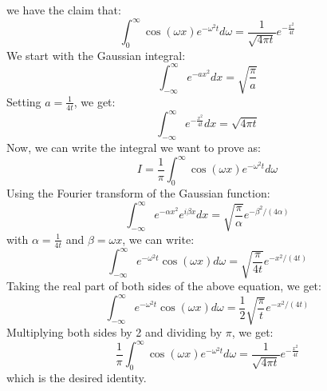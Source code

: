 \documentclass[12pt]{article} %
\begin{document}
we have the claim that:
$$
\int_{0}^{\infty} \cos(\omega x) e^{- \omega^{2} t}  d \omega = \frac{1}{\sqrt{4 \pi t}} e^{-\frac{x^2}{4t}}
$$
We start with the Gaussian integral:
$$\int_{-\infty}^{\infty} e^{-ax^2} dx = \sqrt{\frac{\pi}{a}}$$
Setting $a = \frac{1}{4t}$, we get:
$$\int_{-\infty}^{\infty} e^{-\frac{x^2}{4t}} dx = \sqrt{4 \pi t}$$
Now, we can write the integral we want to prove as:
$$I = \frac{1}{\pi} \int_{0}^{\infty} \cos(\omega x) e^{- \omega^{2} t} d \omega$$
Using the Fourier transform of the Gaussian function:
$$\int_{-\infty}^{\infty} e^{-\alpha x^2} e^{i\beta x} dx = \sqrt{\frac{\pi}{\alpha}} e^{-\beta^2/(4\alpha)}$$
with $\alpha = \frac{1}{4t}$ and $\beta = \omega x$, we can write:
$$\int_{-\infty}^{\infty} e^{-\omega^2 t} \cos(\omega x) d\omega = \sqrt{\frac{\pi}{4t}} e^{-x^2/(4t)}$$
Taking the real part of both sides of the above equation, we get:
$$\int_{-\infty}^{\infty} e^{-\omega^2 t} \cos(\omega x) d\omega = \frac{1}{2} \sqrt{\frac{\pi}{t}} e^{-x^2/(4t)}$$
Multiplying both sides by 2 and dividing by $\pi$, we get:
$$\frac{1}{\pi} \int_{0}^{\infty} \cos(\omega x) e^{- \omega^{2} t} d \omega = \frac{1}{\sqrt{4 \pi t}} e^{-\frac{x^2}{4t}}$$
which is the desired identity.\par
\end{document}
